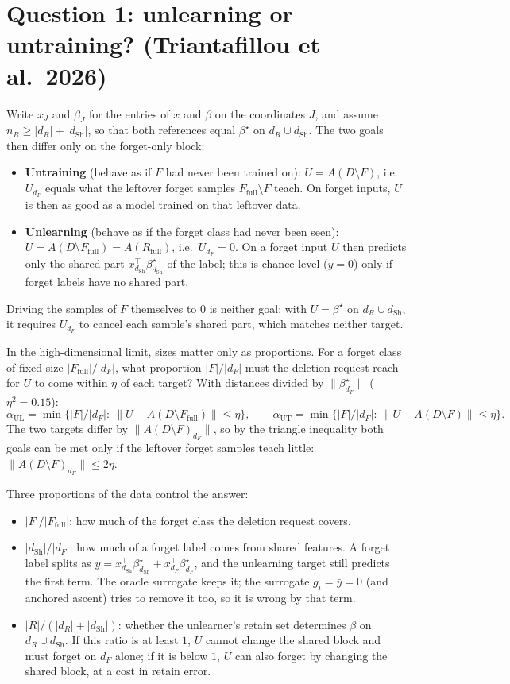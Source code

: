\documentclass[10pt]{article}
\newcommand{\Rf}{R_{\mathrm{full}}}
\newcommand{\Ff}{F_{\mathrm{full}}}
\newcommand{\dSh}{d_{\mathrm{Sh}}}
\begin{document}
\section{Question 1: unlearning or untraining? (Triantafillou et al.\ 2026)}
Write $x_J$ and $\beta_J$ for the entries of $x$ and $\beta$ on the coordinates $J$, and assume $n_R\ge|d_R|+|\dSh|$, so that both references equal $\beta^\star$ on $d_R\cup\dSh$. The two goals then differ only on the forget-only block:
\begin{itemize}\itemsep1pt
\item \textbf{Untraining} (behave as if $F$ had never been trained on): $U=A(D\setminus F)$, i.e.\ $U_{d_F}$ equals what the leftover forget samples $\Ff\setminus F$ teach. On forget inputs, $U$ is then as good as a model trained on that leftover data.
\item \textbf{Unlearning} (behave as if the forget class had never been seen): $U=A(D\setminus\Ff)=A(\Rf)$, i.e.\ $U_{d_F}=0$. On a forget input $U$ then predicts only the shared part $x_{\dSh}^\top\beta^\star_{\dSh}$ of the label; this is chance level ($\bar y=0$) only if forget labels have no shared part.
\end{itemize}
Driving the samples of $F$ themselves to $0$ is neither goal: with $U=\beta^\star$ on $d_R\cup\dSh$, it requires $U_{d_F}$ to cancel each sample's shared part, which matches neither target.

In the high-dimensional limit, sizes matter only as proportions. For a forget class of fixed size $|\Ff|/|d_F|$, what proportion $|F|/|d_F|$ must the deletion request reach for $U$ to come within $\eta$ of each target? With distances divided by $\|\beta^\star_{d_F}\|$ ($\eta^2=0.15$):
\[
\alpha_{\mathrm{UL}}=\min\big\{|F|/|d_F|:\ \|U-A(D\setminus\Ff)\|\le\eta\big\},\qquad
\alpha_{\mathrm{UT}}=\min\big\{|F|/|d_F|:\ \|U-A(D\setminus F)\|\le\eta\big\}.
\]
The two targets differ by $\|A(D\setminus F)_{d_F}\|$, so by the triangle inequality both goals can be met only if the leftover forget samples teach little: $\|A(D\setminus F)_{d_F}\|\le2\eta$.

Three proportions of the data control the answer:
\begin{itemize}\itemsep1pt
\item $|F|/|\Ff|$: how much of the forget class the deletion request covers.
\item $|\dSh|/|d_F|$: how much of a forget label comes from shared features. A forget label splits as $y=x_{\dSh}^\top\beta^\star_{\dSh}+x_{d_F}^\top\beta^\star_{d_F}$, and the unlearning target still predicts the first term. The oracle surrogate keeps it; the surrogate $g_i=\bar y=0$ (and anchored ascent) tries to remove it too, so it is wrong by that term.
\item $|R|/(|d_R|+|\dSh|)$: whether the unlearner's retain set determines $\beta$ on $d_R\cup\dSh$. If this ratio is at least $1$, $U$ cannot change the shared block and must forget on $d_F$ alone; if it is below $1$, $U$ can also forget by changing the shared block, at a cost in retain error.
\end{itemize}
\end{document}
